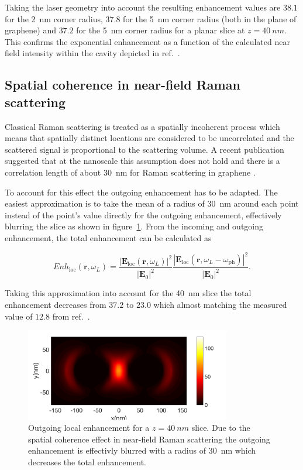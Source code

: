 Taking the laser geometry into account the resulting enhancement values are $38.1$ for the \SI{2}{nm} corner radius, $37.8$ for the \SI{5}{nm} corner radius (both in the plane of graphene) and $37.2$ for the \SI{5}{nm} corner radius for a planar slice at $z=\SI{40}{nm}$. This confirms the exponential enhancement as a function of the calculated near field intensity within the cavity depicted in ref.~\cite{heeg}.

\subsection{Spatial coherence in near-field Raman scattering}

Classical Raman scattering is treated as a spatially incoherent process which means that spatially distinct locations are considered to be uncorrelated and the scattered signal is proportional to the scattering volume. A recent publication suggested that at the nanoscale this assumption does not hold and there is a correlation length of about \SI{30}{nm} for Raman scattering in graphene \cite{coherence}.

To account for this effect the outgoing enhancement has to be adapted. The easiest approximation is to take the mean of a radius of \SI{30}{nm} around each point instead of the point's value directly for the outgoing enhancement, effectively blurring the slice as shown in figure~\ref{fig:coherence}. From the incoming and outgoing enhancement, the total enhancement can be calculated as\cite{maier2007}

\begin{equation}
  Enh_\mathrm{loc}(\mathbf{r},\omega_L)=\frac{\left|\mathbf{E}_\mathrm{loc}(\mathbf{r}, \omega_L)\right|^2}{\left|\mathbf{E}_0\right|^2}\frac{\left|\mathbf{E}_\mathrm{loc}(\mathbf{r}, \omega_L-\omega_\mathrm{ph})\right|^2}{\left|\mathbf{E}_0\right|^2}.
\end{equation}

Taking this approximation into account for the \SI{40}{nm} slice the total enhancement decreases from $37.2$ to $23.0$ which almost matching the measured value of $12.8$ from ref.~\cite{heeg}.

\begin{figure}[!h]
  \centering
  \includegraphics[width=0.8\textwidth]{./images/coherence.png}
  \caption{Outgoing local enhancement for a $z=\SI{40}{nm}$ slice. Due to the spatial coherence effect in near-field Raman scattering the outgoing enhancement is effectivly blurred with a radius of \SI{30}{nm} which decreases the total enhancement.}
  \label{fig:coherence}
\end{figure}
